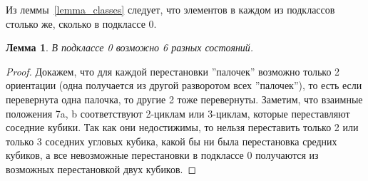\documentclass[utf8,a4paper,draft]{article}
\newtheorem{lemma_cub}{Лемма}
\begin{document}
Из леммы~\ref{lemma_classes} следует, что элементов в каждом из подклассов столько же, сколько в подклассе 0.
\begin{lemma_cub}
В подклассе 0 возможно 6 разных состояний.
\end{lemma_cub}
\begin{proof}
Докажем, что для каждой перестановки ''палочек'' возможно только 2 ориентации (одна получается из другой разворотом всех ''палочек''), то есть если перевернута одна палочка, то другие 2 тоже перевернуты.
Заметим, что взаимные положения 7a, b соответствуют 2-циклам или 3-циклам, которые переставляют соседние кубики. Так как они недостижимы, то нельзя переставить только 2 или только 3 соседних угловых кубика, какой бы ни была перестановка средних кубиков, а все невозможные перестановки в подклассе 0 получаются из возможных перестановкой двух кубиков.

\end{proof}
\end{document}
